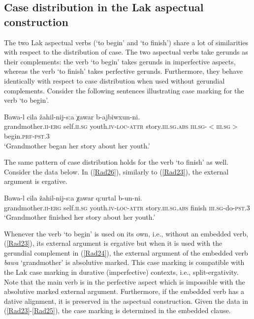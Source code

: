 \documentclass[output=paper]{langscibook}
\begin{document}
\subsection{Case distribution in the Lak aspectual construction}

The two Lak aspectual verbs (‘to begin’ and ‘to finish’) share a lot of similarities with respect to the distribution of case. The two aspectual verbs take gerunds as their complements: the verb ‘to begin’ takes gerunds in imperfective aspects, whereas the verb ‘to finish’ takes perfective gerunds. Furthermore, they behave identically with respect to case distribution when used without gerundial complements. Consider the following sentences illustrating case marking for the verb ‘to begin’.

\ea\label{Rad23}
\gll Bawa-l cila žahil-nij-s:a χawar b-ajbiwxun-ni.\\ 
grandmother.\textsc{ii-erg} self.\textsc{ii.sg} youth.\textsc{iv-loc-attr} story.\textsc{iii.sg.abs} 
\textsc{iii.sg-$<$iii.sg$>$}begin.\textsc{prf-pst.3}\\
\glt ‘Grandmother began her story about her youth.’
\z

The same pattern of case distribution holds for the verb ‘to finish’ as well. Consider the data below. In (\ref{Rad26}), similarly to (\ref{Rad23}), the external argument is ergative.

\ea\label{Rad26}
\gll Bawa-l cila žahil-nij-s:a χawar q:urtal b-un-ni.\\ 	
grandmother.\textsc{ii-erg} self.\textsc{ii.sg} youth.\textsc{iv-loc-attr} story.\textsc{iii.sg.abs}	finish \textsc{iii.sg}-do-\textsc{pst.3}\\ 
\glt ‘Grandmother finished her story about her youth.’
\z

Whenever the verb ‘to begin’ is used on its own, i.e., without an embedded verb, (\ref{Rad23}), its external argument is ergative but when it is used with the gerundial complement in (\ref{Rad24}), the external argument of the embedded verb \textit{bawa} ‘grandmother’ is absolutive marked. This case marking is compatible with the Lak case marking in durative (imperfective) contexts, i.e., split-ergativity. Note that the main verb is in the perfective aspect which is impossible with the absolutive marked external argument. Furthermore, if the embedded verb has a dative alignment, it is preserved in the aspectual construction. Given the data in (\ref{Rad23}-\ref{Rad25}), the case marking is determined in the embedded clause.
\end{document}
